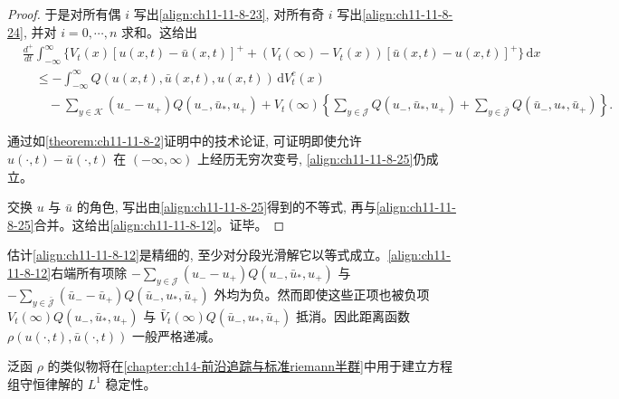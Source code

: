 \documentclass[../../main.tex]{subfiles}
\begin{document}
\begin{proof}
于是对所有偶 $i$ 写出\eqref{align:ch11-11-8-23}, 对所有奇 $i$ 写出\eqref{align:ch11-11-8-24}, 并对 $i=0,\cdots,n$ 求和。这给出
\begin{align}
&\frac{d^+}{dt}\int_{-\infty}^\infty\bigl\{V_t(x)[u(x,t)-\bar u(x,t)]^+
+(V_t(\infty)-V_t(x))[\bar u(x,t)-u(x,t)]^+\bigr\}\,\mathrm{d}x\nonumber\\
&\quad\leqslant-\int_{-\infty}^\infty Q(u(x,t),\bar u(x,t),u(x,t))\,\mathrm{d}V_t^c(x)\nonumber\\
&\qquad-\sum_{y\in\mathscr{K}}(u_--u_+)Q(u_-,\bar u_*,u_+)
+V_t(\infty)\left\{\sum_{y\in\mathscr{J}}Q(u_-,\bar u_*,u_+)
+\sum_{y\in\bar{\mathscr{J}}}Q(\bar u_-,u_*,\bar u_+)\right\}.\label{align:ch11-11-8-25}
\end{align}

通过如\cref{theorem:ch11-11-8-2}证明中的技术论证, 可证明即使允许 $u(\cdot,t)-\bar u(\cdot,t)$ 在 $(-\infty,\infty)$ 上经历无穷次变号, \eqref{align:ch11-11-8-25}仍成立。

交换 $u$ 与 $\bar u$ 的角色, 写出由\eqref{align:ch11-11-8-25}得到的不等式, 再与\eqref{align:ch11-11-8-25}合并。这给出\eqref{align:ch11-11-8-12}。证毕。
\end{proof}

估计\eqref{align:ch11-11-8-12}是精细的, 至少对分段光滑解它以等式成立。\eqref{align:ch11-11-8-12}右端所有项除 $-\sum_{y\in\mathscr{J}}(u_--u_+)Q(u_-,\bar u_*,u_+)$ 与 $-\sum_{y\in\bar{\mathscr{J}}}(\bar u_--\bar u_+)Q(\bar u_-,u_*,\bar u_+)$ 外均为负。然而即使这些正项也被负项 $V_t(\infty)Q(u_-,\bar u_*,u_+)$ 与 $\bar V_t(\infty)Q(\bar u_-,u_*,\bar u_+)$ 抵消。因此距离函数 $\rho(u(\cdot,t),\bar u(\cdot,t))$ 一般严格递减。

泛函 $\rho$ 的类似物将在\cref{chapter:ch14-前沿追踪与标准riemann半群}中用于建立方程组守恒律解的 $L^1$ 稳定性。
\end{document}
